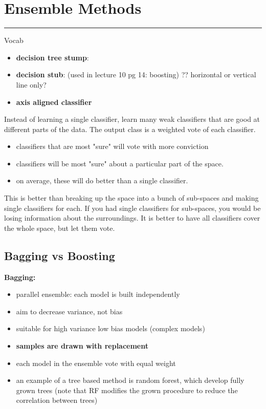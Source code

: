 \section{Ensemble Methods}

\smallskip \hrule height 2pt \smallskip

Vocab
\begin{itemize}
	\item \textbf{decision tree stump}: 
	\item \textbf{decision stub}:  (used in lecture 10 pg 14: boosting)  ?? horizontal or vertical line only?  
	\item \textbf{axis aligned classifier}
\end{itemize}

Instead of learning a single classifier, learn many weak classifiers that are good at different parts of the data. 
The output class is a weighted vote of each classifier. 
\begin{itemize}
	\item classifiers that are most "sure" will vote with more conviction
	\item classifiers will be most "sure" about a particular part of the space. 
	\item on average, these will do better than a single classifier. 
\end{itemize}

This is better than breaking up the space into a bunch of sub-spaces and making single classifiers for each.  
If you had single classifiers for sub-spaces, you would be losing information about the surroundings.
It is better to have all classifiers cover the whole space, but let them vote. 

\subsection{Bagging vs Boosting}
\textbf{Bagging:} %
\begin{itemize}
	\item parallel ensemble: each model is built independently
	\item aim to decrease variance, not bias
	\item suitable for high variance low bias models (complex models)
	\item \textbf{samples are drawn with replacement}
	\item each model in the ensemble vote with equal weight %
	\item an example of a tree based method is random forest, which develop fully grown trees (note that RF modifies the grown procedure to reduce the correlation between trees)
\end{itemize}

